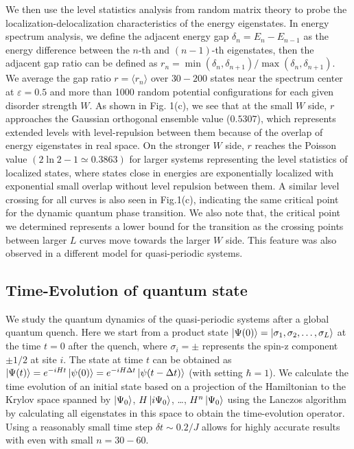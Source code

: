 \documentclass[prl,aps,epsf,showpacs,twocolumn,letterpaper]{revtex4}
\begin{document}
We then use the level statistics analysis from random matrix theory\cite{atas2013,oganesyan2007} to probe the localization-delocalization characteristics of the energy eigenstates.  
In energy spectrum analysis\cite{luitz2015}, we define the adjacent energy gap $\delta_n=E_n-E_{n-1}$ as the energy difference between the $n$-th and $(n-1)$-th eigenstates, then the adjacent gap ratio can be defined as $r_n=\min(\delta_n, \delta_{n+1})/\max(\delta_n, \delta_{n+1})$.  We average the gap ratio $r=\langle r_n\rangle$ over $30-200$ states near the spectrum center at $\varepsilon=0.5$ and more than 1000 random potential configurations for each given disorder strength $W$.  As shown in Fig. 1(c), we see that at the small $W$ side, $r$ approaches the Gaussian orthogonal ensemble value ($0.5307$), which represents extended levels with level-repulsion between them because of the overlap of energy eigenstates in real space.  On the stronger $W$ side, $r$ reaches the Poisson value $(2\ln2-1\simeq 0.3863)$ for larger systems representing the level statistics of localized states, where states close in energies are exponentially localized with exponential small overlap without level repulsion between them\cite{mehta1991}.  A similar level crossing for all curves is also seen in Fig.1(c), indicating the same critical point for the dynamic quantum phase transition.  We also note that, the critical point we determined represents a lower bound for the transition as the crossing points between larger $L$ curves move towards the larger $W$ side.  This feature was also observed in a different model for quasi-periodic systems\cite{vedika2016}.


\subsection{Time-Evolution of quantum state}


We study the quantum dynamics of the quasi-periodic systems after a global quantum quench.  Here we start from a product state $\ket{\Psi(0)}=\ket{\sigma_1, \sigma_2, \ldots , \sigma_L}$  at the time $t=0$ after the quench, where $\sigma_i=\pm$ represents the spin-z component $\pm 1/2$ at site $i$.  The state at time $t$ can be obtained as $\ket{\Psi(t)} = e^{-iHt}\ket{\psi(0)}=e^{-iH\Delta t}\ket{\psi(t-\Delta t)}$ (with setting $\hbar=1$).  We calculate the time evolution of an initial  state  based on  a projection of the Hamiltonian to the Krylov space spanned by $\ket{\Psi_0}$, $H\ket{i\Psi_0}$, \ldots, $H^n\ket{\Psi_0}$ using the Lanczos algorithm by calculating all eigenstates in this space to obtain the time-evolution operator\cite{luitz2015}.  Using a reasonably small time step $\delta t \sim 0.2/J$ allows for highly accurate results with even with small $n=30-60$.
\end{document}
